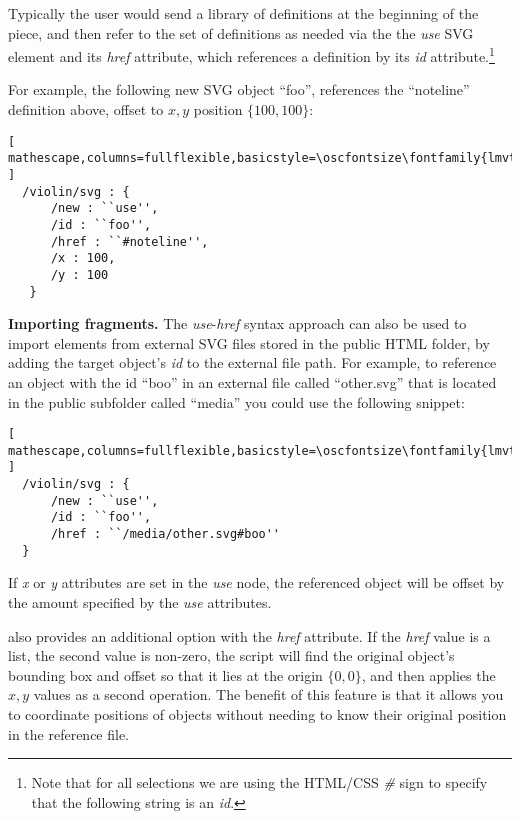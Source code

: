 Typically the user would send a library of definitions at the beginning of the piece, and then refer to the set of definitions as needed via the the \textit{use} SVG element and its \textit{href} attribute, which references a definition by its \textit{id} attribute.\footnote{Note that for all selections we are using the HTML/CSS \textit{\#} sign to specify that the following string is an \textit{id}.}

For example, the following new SVG object ``foo'', references the ``noteline'' definition above, offset to ${x,y}$ position $\{100,100\}$:

\begin{minipage}{\linewidth}
\begin{lstlisting}[ mathescape,columns=fullflexible,basicstyle=\oscfontsize\fontfamily{lmvtt}\selectfont ]
  /violin/svg : {
      /new : ``use'',
      /id : ``foo'',
      /href : ``#noteline'',
      /x : 100,
      /y : 100
   }
 \end{lstlisting}
\end{minipage}

\medskip
\noindent
\textbf{Importing fragments.} 
The \textit{use}-\textit{href} syntax approach can also be used to import elements from external SVG files stored in the public HTML folder, by adding the target object's \textit{id} to the external file path.
For example, to reference an object with the id ``boo'' in an external file called ``other.svg'' that is located in the public subfolder called ``media'' you could use the following snippet:

\begin{lstlisting}[ mathescape,columns=fullflexible,basicstyle=\oscfontsize\fontfamily{lmvtt}\selectfont ]
  /violin/svg : {
      /new : ``use'',
      /id : ``foo'',
      /href : ``/media/other.svg#boo''
  }
 \end{lstlisting}

If \textit{x} or \textit{y} attributes are set in the \textit{use} node, the referenced object will be offset by the amount specified by the  \textit{use} attributes.

\drawsocket also provides an additional option with the \textit{href} attribute. If the \textit{href} value is a list, the second value is non-zero, the script will find the original object's bounding box and offset so that it lies at the origin $\{0,0\}$, and then applies the ${x,y}$ values as a second operation. The benefit of this feature is that it allows you to coordinate positions of objects without needing to know their original position in the reference file.

